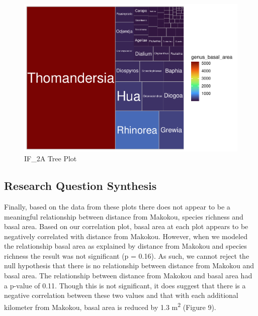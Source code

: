 \documentclass[
  12pt,
]{article}
\begin{document}
\begin{figure}
\centering
\includegraphics{GoldenGriffithsKnierMalinowski_ENV872_Project_files/figure-latex/unnamed-chunk-11-1.pdf}
\caption{IF\_2A Tree Plot}
\end{figure}

\hypertarget{research-question-synthesis-1}{%
\subsection{Research Question
Synthesis}\label{research-question-synthesis-1}}

Finally, based on the data from these plots there does not appear to be
a meaningful relationship between distance from Makokou, species
richness and basal area. Based on our correlation plot, basal area at
each plot appears to be negatively correlated with distance from
Makokou. However, when we modeled the relationship basal area as
explained by distance from Makokou and species richness the result was
not significant (p = 0.16). As such, we cannot reject the null
hypothesis that there is no relationship between distance from Makokou
and basal area. The relationship between distance from Makokou and basal
area had a p-value of 0.11. Though this is not significant, it does
suggest that there is a negative correlation between these two values
and that with each additional kilometer from Makokou, basal area is
reduced by 1.3 m\textsuperscript{2} (Figure 9).
\end{document}

